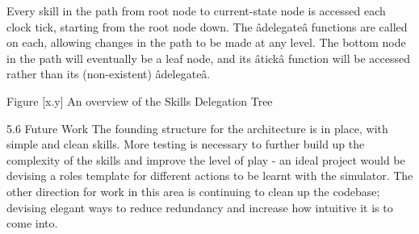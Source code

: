 Every skill in the path from root node to current-state node is accessed each clock tick, starting from the root node down. The âdelegateâ functions are called on each, allowing changes in the path to be made at any level. The bottom node in the path will eventually be a leaf node, and its âtickâ function will be accessed rather than its (non-existent) âdelegateâ.


Figure [x.y] An overview of the Skills Delegation Tree

5.6 Future Work
The founding structure for the architecture is in place, with simple and clean skills. More testing is necessary to further build up the complexity of the skills and improve the level of play - an ideal project would be devising a roles template for different actions to be learnt with the simulator. 
The other direction for work in this area is continuing to clean up the codebase; devising elegant ways to reduce redundancy and increase how intuitive it is to come into.

